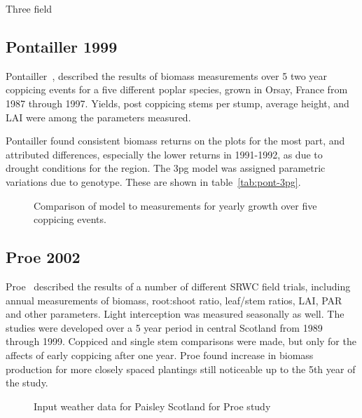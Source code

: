 \documentclass[10pt]{article}
\begin{document}
Three field
\subsection{Pontailler 1999}
\label{sec:pont}

Pontailler~\cite{Pontailler1999}, described the results of biomass
measurements over 5 two year coppicing events for a five different
poplar species, grown in Orsay, France from 1987 through 1997.
Yields, post coppicing stems per stump, average height, and \ac{LAI}
were among the parameters measured.

Pontailler found consistent biomass returns on the plots for the most
part, and attributed differences, especially the lower returns in
1991-1992, as due to drought conditions for the region.  The \ac{3pg}
model was assigned parametric variations due to genotype.  These are
shown in table~\ref{tab:pont-3pg}.

\begin{table}[!ht]
  \centering
  \caption{\ac{3pg} parameter variations of \ac{3pg} among genotypes}
  \label{tab:pont-3pg}
\end{table}

\begin{figure}[!ht]
  \centering

  \caption{Comparison of model to measurements for yearly growth over five
    coppicing events.}
\label{fig:pont-biomass}
\end{figure}


\subsection*{Proe 2002}

Proe~\cite{Proe2002} described the results of a number of different
\ac{SRWC} field trials, including annual measurements of biomass,
root:shoot ratio, leaf/stem ratios, LAI, PAR and other parameters.
Light interception was measured seasonally as well.  The studies were
developed over a 5 year period in central Scotland from 1989 through
1999. Coppiced and single stem comparisons
were made, but only for the affects of early coppicing after one year.
Proe found increase in biomass production for more closely spaced
plantings still noticeable up to the 5th year of the study.

\begin{figure}
  \centering
  
  \caption{Input weather data for Paisley Scotland for Proe study}
  \label{fig:proe-weather}
\end{figure}
\end{document}
